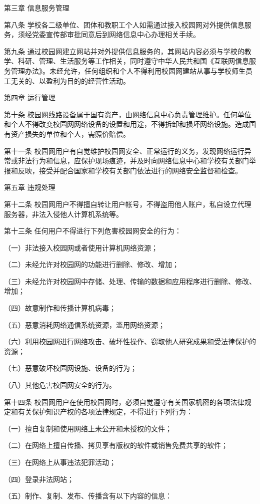 \documentclass[UTF8,12pt,a4paper]{report}
\begin{document}
第三章 信息服务管理

第八条 学校各二级单位、团体和教职工个人如需通过接入校园网对外提供信息服务，须经党委宣传部审批同意后到网络信息中心办理相关手续。

第九条 通过校园网建立网站并对外提供信息服务的，其网站内容必须与学校的教学、科研、管理、生活服务等工作相关，同时遵守中华人民共和国《互联网信息服务管理办法》。未经允许，任何组织和个人不得利用校园网建站从事与学校师生员工无关的、以盈利为目的的经营性活动。

第四章 运行管理

第十条 校园网线路设备属于国有资产，由网络信息中心负责管理维护。任何单位和个人不得改变校园网网络设备的设置和用途，不得拆卸和损坏网络设施。造成国有资产损失的单位和个人，需照价赔偿。

第十一条 校园网用户有自觉维护校园网安全、正常运行的义务，发现网络运行异常或非法行为和信息，应保护现场痕迹，并及时向网络信息中心和学校有关部门举报和反映，接受并配合国家和学校有关部门依法进行的网络安全监督和检查。

第五章 违规处理

第十二条 校园网用户不得擅自转让用户帐号，不得盗用他人账户，私自设立代理服务器，非法入侵他人计算机系统等。

第十三条 任何用户不得进行下列危害校园网安全的行为：

（一）非法接入校园网或者使用计算机网络资源；

（二）未经允许对校园网的功能进行删除、修改、增加；

（三）未经允许对校园网中存储、处理、传输的数据和应用程序进行删除、修改、增加；

（四）故意制作和传播计算机病毒；

（五）恶意消耗网络通信系统资源，滥用网络资源；

（六）利用校园网进行网络攻击、破坏性操作、窃取他人研究成果和受法律保护的资源；

（七）恶意破坏校园网设施、设备的行为；

（八）其他危害校园网安全的行为。

第十四条 校园网用户在使用校园网时，必须自觉遵守有关国家机密的各项法律规定和有关保护知识产权的各项法律规定，不得进行下列行为：

（一）擅自复制和使用网络上未公开和未授权的文件；

（二）在网络上擅自传播、拷贝享有版权的软件或销售免费共享的软件；

（三）在网络上从事违法犯罪活动；

（四）登录非法网站；

（五）制作、复制、发布、传播含有以下内容的信息：
\end{document}
